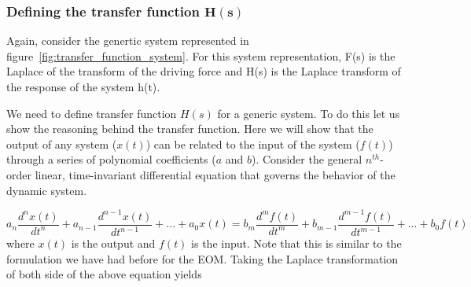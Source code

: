 \documentclass[12pt,letter]{article}
\numberwithin{ex}{section} %
\numberwithin{re}{section} %
\begin{document}
\subsubsection{Defining the transfer function $\mathbf{H(s)}$}

Again, consider the genertic system represented in figure~\ref{fig:transfer_function_system}. For this system representation, F(s) is the Laplace of the transform of the driving force and H(s) is the Laplace transform of the response of the system h(t). 

We need to define transfer function $H(s)$ for a generic system. To do this let us show the reasoning behind the transfer function. Here we will show that the output of any system ($x(t)$) can be related to the input of the system ($f(t)$) through a series of polynomial coefficients ($a$ and $b$). Consider the general $n^{th}$-order linear, time-invariant differential equation that governs the behavior of the dynamic system.

\begin{equation}
a_n\frac{d^nx(t)}{dt^n} + a_{n-1}\frac{d^{n-1}x(t)}{dt^{n-1}} + ... + a_0x(t) = b_m\frac{d^mf(t)}{dt^m} + b_{m-1}\frac{d^{m-1}f(t)}{dt^{m-1}} + ... + b_0f(t)
\end{equation} 
where $x(t)$ is the output and $f(t)$ is the input. Note that this is similar to the formulation we have had before for the EOM. Taking the Laplace transformation of both side of the above equation yields
\end{document}
